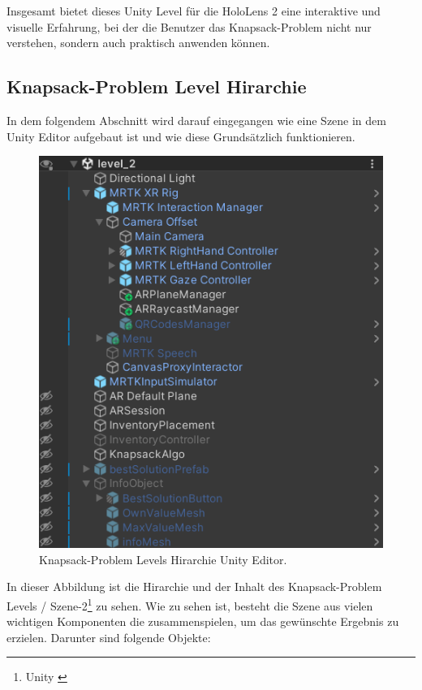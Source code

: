 Insgesamt bietet dieses Unity Level für die HoloLens 2 eine interaktive und visuelle Erfahrung,
bei der die Benutzer das Knapsack-Problem nicht nur verstehen, sondern auch praktisch anwenden können.

\subsection{Knapsack-Problem Level Hirarchie}
In dem folgendem Abschnitt wird darauf eingegangen wie eine Szene in dem Unity Editor aufgebaut ist und wie diese Grundsätzlich
funktionieren.\\

\begin{figure}[h]
    \centering
    \includegraphics[scale=0.8]{images/Level2Hirarchy}
    \caption{Knapsack-Problem Levels Hirarchie Unity Editor.}
    \label{fig:level2_hierarchy}
\end{figure}

In dieser Abbildung ist die Hirarchie und der Inhalt des Knapsack-Problem Levels / Szene-2\footnote{Unity \cite{Scene}} zu sehen.
Wie zu sehen ist, besteht die Szene aus vielen wichtigen Komponenten die zusammenspielen, um das gewünschte Ergebnis
zu erzielen. Darunter sind folgende Objekte:

